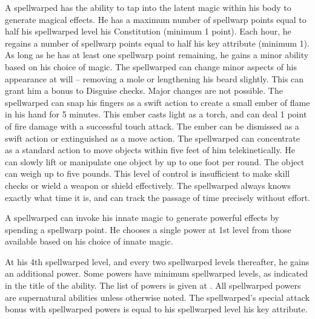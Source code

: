 A spellwarped has the ability to tap into the latent magic within his body to generate magical effects.
He has a maximum number of spellwarp points equal to half his spellwarped level \add his Constitution (minimum 1 point).
Each hour, he regains a number of spellwarp points equal to half his key attribute (minimum 1).
As long as he has at least one spellwarp point remaining, he gains a minor ability based on his choice of magic.
The spellwarped can change minor aspects of his appearance at will -- removing a mole or lengthening his beard slightly.
This can grant him a  bonus to Disguise checks.
Major changes are not possible.
The spellwarped can snap his fingers as a swift action to create a small ember of flame in his hand for 5 minutes.
This ember casts light as a torch, and can deal 1 point of fire damage with a successful touch attack.
The ember can be dismissed as a swift action or extinguished as a move action.
The spellwarped can concentrate as a standard action to move objects within five feet of him telekinetically.
He can slowly lift or manipulate one object by up to one foot per round.
The object can weigh up to five pounds.
This level of control is insufficient to make skill checks or wield a weapon or shield effectively.
The spellwarped always knows exactly what time it is, and can track the passage of time precisely without effort.

A spellwarped can invoke his innate magic to generate powerful effects by spending a spellwarp point.
He chooses a single power at 1st level from those available based on his choice of innate magic.

At his 4th spellwarped level, and every two spellwarped levels thereafter, he gains an additional power.
Some powers have minimum spellwarped levels, as indicated in the title of the ability.
The list of powers is given at .
All spellwarped powers are supernatural abilities unless otherwise noted.
The spellwarped's special attack bonus with spellwarped powers is equal to his spellwarped level \add his key attribute.

